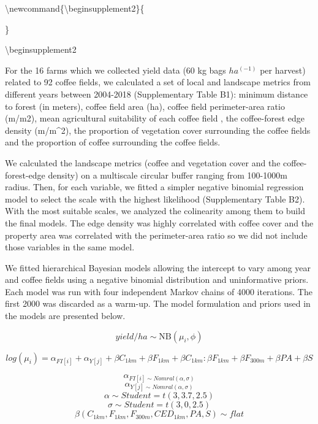 \documentclass[
	12pt,				%
	oneside,			%
	a4paper,			%
	chapter=TITLE,		%
	section=TITLE,		%
	brazil,			%
	english				%
	]{abntex2}
\begin{document}
\textbackslash newcommand\{\textbackslash beginsupplement2\}\{
\setcounter{table}{0}\\

\renewcommand{\thetable}{B\arabic{table}} 
  \setcounter{figure}{0} 
  \renewcommand{\thefigure}{B\arabic{figure}}

\}

\textbackslash beginsupplement2

For the 16 farms which we collected yield data (60 kg bags \(ha^(-1)\) per harvest) related to 92 coffee fields, we calculated a set of local and landscape metrics from different years between 2004-2018 (Supplementary Table B1): minimum distance to forest (in meters), coffee field area (ha), coffee field perimeter-area ratio (m/m2), mean agricultural suitability of each coffee field \autocite*[based on the index developed by Sparovek et al.][]{sparovek_effects_2015}, the coffee-forest edge density (m/m\^{}2), the proportion of vegetation cover surrounding the coffee fields and the proportion of coffee surrounding the coffee fields.

We calculated the landscape metrics (coffee and vegetation cover and the coffee-forest-edge density) on a multiscale circular buffer ranging from 100-1000m radius. Then, for each variable, we fitted a simpler negative binomial regression model to select the scale with the highest likelihood (Supplementary Table B2). With the most suitable scales, we analyzed the colinearity among them to build the final models. The edge density was highly correlated with coffee cover and the property area was correlated with the perimeter-area ratio so we did not include those variables in the same model.

We fitted hierarchical Bayesian models allowing the intercept to vary among year and coffee fields using a negative binomial distribution and uninformative priors. Each model was run with four independent Markov chains of 4000 iterations. The first 2000 was discarded as a warm-up. The model formulation and priors used in the models are presented below.

\[ yield/ha \sim \text{NB}( \mu_i, \phi)  \]

\[  log (\mu_i)  = \alpha_{FI[i]} + \alpha_{Y[j]} + \beta C_{1km} + \beta F_{1km}+ \beta C_{1km}: \beta F_{1km} + \beta F_{300m} + \beta PA + \beta S \]

\[ \alpha_{FI[i] \sim Nomral(\alpha,\sigma)}  \]
\[ \alpha_{Y[j] \sim Nomral(\alpha,\sigma)}  \]
\[ \alpha \sim Student =  t(3,3.7,2.5)  \]
\[ \sigma \sim Student =  t(3,0,2.5)  \]
\[ \beta (C_{1km},F_{1km},F_{300m}, CED_{1km}, PA, S) \sim flat  \]
\end{document}
